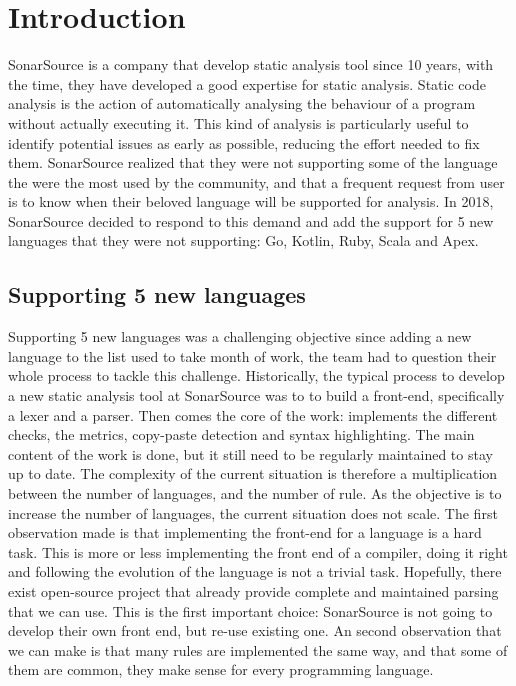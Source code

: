 \section{Introduction}
\label{sec:introduction}
SonarSource is a company that develop static analysis tool since 10 years, with the time, they have developed a good expertise for static analysis.
Static code analysis is the action of automatically analysing the behaviour of a program without actually executing it.
This kind of analysis is particularly useful to identify potential issues as early as possible, reducing the effort needed to fix them.
SonarSource realized that they were not supporting some of the language the were the most used by the community, and that a frequent request from user is to know when their beloved language will be supported for analysis. 
In 2018, SonarSource decided to respond to this demand and add the support for 5 new languages that they were not supporting: Go, Kotlin, Ruby, Scala and Apex.

\subsection{Supporting 5 new languages}
\label{subsec:5_new_languages}
Supporting 5 new languages was a challenging objective since adding a new language to the list used to take month of work, the team had to question their whole process to tackle this challenge.
Historically, the typical process to develop a new static analysis tool at SonarSource was to to build a front-end, specifically a lexer and a parser.
Then comes the core of the work: implements the different checks, the metrics, copy-paste detection and syntax highlighting. The main content of the work is done, but it still need to be regularly maintained to stay up to date.
The complexity of the current situation is therefore a multiplication between the number of languages, and the number of rule. 
As the objective is to increase the number of languages, the current situation does not scale.
The first observation made is that implementing the front-end for a language is a hard task. This is more or less implementing the front end of a compiler, doing it right and following the evolution of the language is not a trivial task.
Hopefully, there exist open-source project that already provide complete and maintained parsing that we can use. 
This is the first important choice: SonarSource is not going to develop their own front end, but re-use existing one.
An second observation that we can make is that many rules are implemented the same way, and that some of them are common, they make sense for every programming language.


